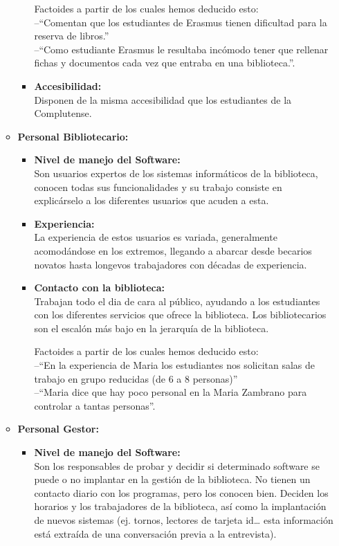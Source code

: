 \documentclass[12pt]{article}
\begin{document}
\begin{itemize}
\begin{itemize}
\begin{itemize}
			Factoides a partir de los cuales hemos deducido esto: \\ --``Comentan que los estudiantes de Erasmus tienen dificultad para la reserva de libros.'' \\ --``Como estudiante Erasmus le resultaba incómodo tener que rellenar fichas y documentos cada vez que entraba en una biblioteca.''.

		\item \textbf{Accesibilidad: \\}
			Disponen de la misma accesibilidad que los estudiantes de la Complutense.

	\end{itemize}
	\item \textbf{Personal Bibliotecario: }
	\begin{itemize}
		\item \textbf{Nivel de manejo del Software: \\}
			Son usuarios expertos de los sistemas informáticos de la biblioteca, conocen todas sus funcionalidades y su trabajo consiste en explicárselo a los diferentes usuarios que acuden a esta.
			
		\item \textbf{Experiencia: \\}
			La experiencia de estos usuarios es variada, generalmente acomodándose en los extremos, llegando a abarcar desde becarios novatos hasta longevos trabajadores con décadas de experiencia.
			
		\item \textbf{Contacto con la biblioteca: \\}
			Trabajan todo el dia de cara al público, ayudando a los estudiantes con los diferentes servicios que ofrece la biblioteca. Los bibliotecarios son el escalón más bajo en la jerarquía de la biblioteca.
			
			Factoides a partir de los cuales hemos deducido esto: \\ --``En la experiencia de Maria los estudiantes nos solicitan salas de trabajo en grupo reducidas (de 6 a 8 personas)'' \\ --``Maria dice que hay poco personal en la Maria Zambrano para controlar a tantas personas''.
			
	\end{itemize}
	\item \textbf{Personal Gestor: }
	\begin{itemize}
		\item \textbf{Nivel de manejo del Software: \\}
			Son los responsables de probar y decidir si determinado software se puede o no implantar en la gestión de la biblioteca. No tienen un contacto diario con los programas, pero los conocen bien. Deciden los horarios y los trabajadores de la biblioteca, así como la implantación de nuevos sistemas (ej. tornos, lectores de tarjeta id… esta información está extraída de una conversación previa a la entrevista).
			

\end{itemize}
\end{itemize}
\end{itemize}
\end{document}
